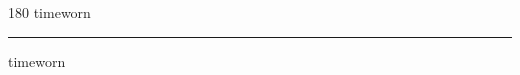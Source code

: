 
\begin{frame}
\begin{center}
\begin{turn}{180}
{\fontsize{2.5cm}{1em}\selectfont timeworn}
\end{turn}
\vspace{1em}\par  
\hrule
\vspace{1em}\par  
{\fontsize{2.5cm}{1em}\selectfont timeworn}
\end{center}
\end{frame}
